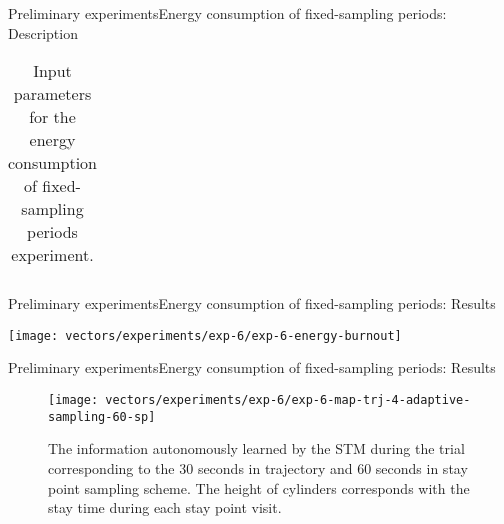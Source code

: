 \begin{frame}{Preliminary experiments}{Energy consumption of fixed-sampling periods: Description}
\begin{table}
{\begin{tabular}{@{}lll@{}}
\bottomrule
\end{tabular}%
}
\caption{Input parameters for the energy consumption of fixed-sampling periods experiment.}
\label{tab:exp-6-input-parameters}
\end{table}
\end{frame}

\begin{frame}{Preliminary experiments}{Energy consumption of fixed-sampling periods: Results}
\vspace{-0.4cm}
{
  \centering
  \texttt{[image: vectors/experiments/exp-6/exp-6-energy-burnout]}
  \par
}
\end{frame}

\begin{frame}{Preliminary experiments}{Energy consumption of fixed-sampling periods: Results}
\begin{figure}
  \texttt{[image: vectors/experiments/exp-6/exp-6-map-trj-4-adaptive-sampling-60-sp]}
  \caption{The information autonomously learned by the STM during the trial corresponding to the 30 seconds in trajectory and 60 seconds in stay point sampling scheme. The height of cylinders corresponds with the stay time during each stay point visit.}
  \label{fig:exp-6-stm-60-seconds-sp}
\end{figure}
\end{frame}

